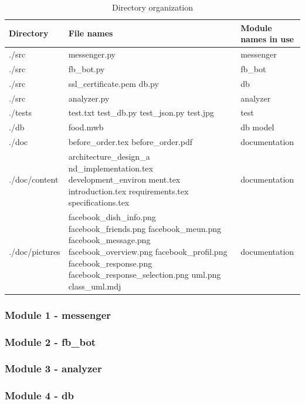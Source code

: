 \begin{table}[htbp]
\caption{Directory organization}
\begin{tabularx}{\linewidth}{|X|X|X|}
\toprule
Directory & File names & Module names in use  \\
\midrule
./src & messenger.py & messenger  \\
./src & fb\_bot.py &  fb\_bot \\
./src & ssl\_certificate.pem db.py & db  \\
./src & analyzer.py & analyzer  \\
./tests & 
test.txt \newline 
test\_db.py \newline
test\_json.py	 \newline
test.jpg  \newline
& test\\
./db & food.mwb & db model  \\
./doc & before\_order.tex before\_order.pdf & documentation  \\
./doc/content & architecture\_design\_a nd\_implementation.tex development\_environ ment.tex introduction.tex requirements.tex specifications.tex& documentation  \\
./doc/pictures & 
facebook\_dish\_info.png \newline
facebook\_friends.png \newline
facebook\_meun.png \newline
facebook\_message.png \newline
facebook\_overview.png \newline
facebook\_profil.png \newline
facebook\_response.png \newline
facebook\_response\_selection.png	\newline
uml.png \newline
class\_uml.mdj \newline
& documentation \\
\end{tabularx}
\end{table}
\FloatBarrier

\subsubsection{Module 1 - messenger}


\subsubsection{Module 2 - fb\_bot}

\subsubsection{Module 3 - analyzer}

\subsubsection{Module 4 - db}

